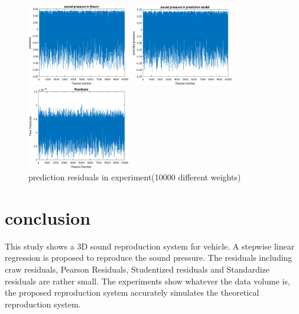 \documentclass[runningheads,a4paper]{llncs}
\begin{document}
\begin{figure}[bthp]
  \begin{minipage}{0.28\linewidth}
    \centerline{\includegraphics[width=4.5cm]{Experimentwith10000data_pressure.eps}}
  \end{minipage}
  \hfill
  \begin{minipage}{.28\linewidth}
    \centerline{\includegraphics[width=4.5cm]{Experimentwith10000data_PressurePredicted.eps}}
  \end{minipage}
  \hfill
  \begin{minipage}{0.28\linewidth}
    \centerline{\includegraphics[width=4.5cm]{Experimentwith10000data_Residuals.eps}}
  \end{minipage}
  \vfill
  \caption{prediction residuals in experiment(10000 different weights)}\label{fig:250Hz}
  \label{fig:Experimentwith10000data_Residuals}
\end{figure}



\section{conclusion}\label{sec:conclusion}
This study shows a 3D sound reproduction system for vehicle. A stepwise linear regression is proposed to reproduce the sound pressure. The residuals including craw residuals, Pearson Residuals, Studentized residuals and Standardize residuals are rather small. The experiments show whatever the data volume is, the proposed reproduction system accurately simulates the theoretical reproduction system.
\end{document}
